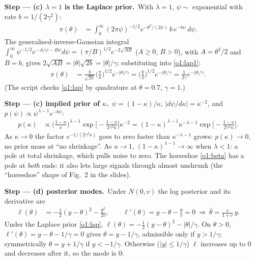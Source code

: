 \documentclass[11pt,a4paper]{article}
\newcommand{\passo}[2]{\par\smallskip\noindent\textbf{Step --- #1.}~#2}
\begin{document}
\begin{sol}
\passo{(c) $\lambda=1$ is the Laplace prior}{With $\lambda=1$, $\psi\sim$ exponential with rate $b=1/(2\gamma^2)$:
\begin{align}
\pi(\theta)&=\int_0^\infty(2\pi\psi)^{-1/2}e^{-\theta^2/(2\psi)}\,b\,e^{-b\psi}\,d\psi.\label{o1:lap1}
\end{align}
The generalised-inverse-Gaussian integral $\int_0^\infty\psi^{-1/2}e^{-A/\psi-B\psi}d\psi=(\pi/B)^{1/2}e^{-2\sqrt{AB}}$ ($A\ge0$, $B>0$), with $A=\theta^2/2$ and $B=b$, gives $2\sqrt{AB}=|\theta|\sqrt{2b}=|\theta|/\gamma$; substituting into \eqref{o1:lap1}:
\begin{align}
\pi(\theta)&=\frac{b}{\sqrt{2\pi}}\Big(\frac{\pi}{b}\Big)^{1/2}e^{-|\theta|/\gamma}=\Big(\frac b2\Big)^{1/2}e^{-|\theta|/\gamma}=\frac{1}{2\gamma}e^{-|\theta|/\gamma}.\label{o1:lap}
\end{align}
(The script checks \eqref{o1:lap} by quadrature at $\theta=0.7$, $\gamma=1$.)}
\passo{(c) implied prior of $\kappa$}{$\psi=(1-\kappa)/\kappa$, $|d\psi/d\kappa|=\kappa^{-2}$, and $p(\psi)\propto\psi^{\lambda-1}e^{-b\psi}$:
\begin{align}
p(\kappa)&\propto\Big(\frac{1-\kappa}{\kappa}\Big)^{\lambda-1}\exp\Big[-\frac{1-\kappa}{2\gamma^2\kappa}\Big]\kappa^{-2}=(1-\kappa)^{\lambda-1}\kappa^{-\lambda-1}\exp\Big[-\frac{1-\kappa}{2\gamma^2\kappa}\Big].\label{o1:ngk}
\end{align}
As $\kappa\to0$ the factor $e^{-1/(2\gamma^2\kappa)}$ goes to zero faster than $\kappa^{-\lambda-1}$ grows: $p(\kappa)\to0$, no prior mass at ``no shrinkage''. As $\kappa\to1$, $(1-\kappa)^{\lambda-1}\to\infty$ when $\lambda<1$: a pole at total shrinkage, which pulls noise to zero. The horseshoe \eqref{o1:beta} has a pole at \emph{both} ends: it also lets large signals through almost unshrunk (the ``horseshoe'' shape of Fig.~2 in the slides).}
\passo{(d) posterior modes}{Under $N(0,v)$ the log posterior and its derivative are
\begin{align}
\ell(\theta)&=-\tfrac12(y-\theta)^2-\frac{\theta^2}{2v},\qquad\ell'(\theta)=y-\theta-\frac{\theta}{v}=0\ \Rightarrow\ \hat\theta=\frac{v}{1+v}\,y.\label{o1:ridge}
\end{align}
Under the Laplace prior \eqref{o1:lap}, $\ell(\theta)=-\tfrac12(y-\theta)^2-|\theta|/\gamma$. On $\theta>0$, $\ell'(\theta)=y-\theta-1/\gamma=0$ gives $\theta=y-1/\gamma$, admissible only if $y>1/\gamma$; symmetrically $\theta=y+1/\gamma$ if $y<-1/\gamma$. Otherwise ($|y|\le1/\gamma$) $\ell$ increases up to $0$ and decreases after it, so the mode is $0$:
\begin{align}

\end{align}}
\end{sol}
\end{document}
